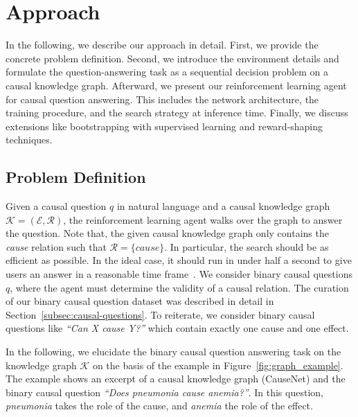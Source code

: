 
\chapter{Approach}
\label{ch:approach}
In the following, we describe our approach in detail. First, we provide the concrete problem definition. Second,
we introduce the environment details and formulate the question-answering task as a sequential decision problem on a causal knowledge graph.
Afterward, we present our reinforcement learning agent for
causal question answering. This includes the network architecture, the training 
procedure, and the search strategy at inference time.
Finally, we discuss extensions like bootstrapping with supervised learning and
reward-shaping techniques.


\section{Problem Definition}
\label{sec:problem-def-env}

Given a causal question $q$ in natural language and a causal knowledge graph $\mathcal{K} = (\mathcal{E}, \mathcal{R})$,
the reinforcement learning agent 
walks over the graph to answer the question. 
Note that, the given causal knowledge graph only contains the \textit{cause} relation such that 
$\mathcal{R} = \{cause\}$.
In particular, the search should be as efficient as 
possible. In the ideal case, it should run in under half a second to give users an answer
in a reasonable time frame~\cite{Arapakis2014Search}.
We consider binary causal questions $q$, where the agent must determine the validity
 of a causal relation. The curation of our binary causal question dataset was described 
 in detail in Section~\ref{subsec:causal-questions}. To reiterate, we consider 
 binary causal questions like \textit{``Can X cause Y?''} which contain exactly one 
 cause and one effect.

In the following, we elucidate the binary causal question answering task on the knowledge graph 
$\mathcal{K}$ on the basis of the example in Figure~\ref{fig:graph_example}.
The example shows an excerpt of a causal knowledge graph (CauseNet) and the 
binary causal question \textit{``Does pneumonia cause anemia?''}. In this question, 
\textit{pneumonia} takes the role of the cause, and \textit{anemia} the role of the effect.

